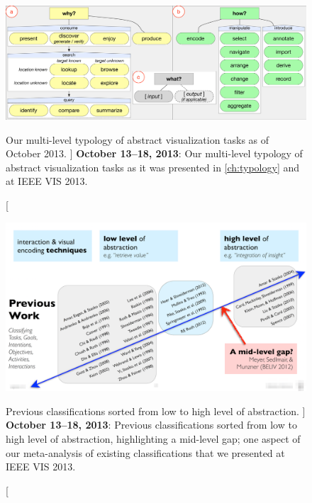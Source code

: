 \begin{figure}
    \centering
    \includegraphics[width=\textwidth]{figures/typology.pdf}
    \caption
    [
        Our multi-level typology of abstract visualization tasks as of October 2013.
    ]
    {
        {\bf October 13--18, 2013}: Our multi-level typology of abstract visualization tasks as it was presented in \autoref{ch:typology} and at IEEE VIS 2013.
    }
    \label{app:typology:fig:typology}
\end{figure}



\begin{figure}
	\centering
	\includegraphics[width=\textwidth]{figures/typology-slides-4.png}
	\caption
	[
	    Previous classifications sorted from low to high level of abstraction.
	]
	{
	    {\bf October 13--18, 2013}: Previous classifications sorted from low to high level of abstraction, highlighting a mid-level gap; one aspect of our meta-analysis of existing classifications that we presented at IEEE VIS 2013.
	}
	\centering
	\label{app:typology:fig:slides-4}
\end{figure}

